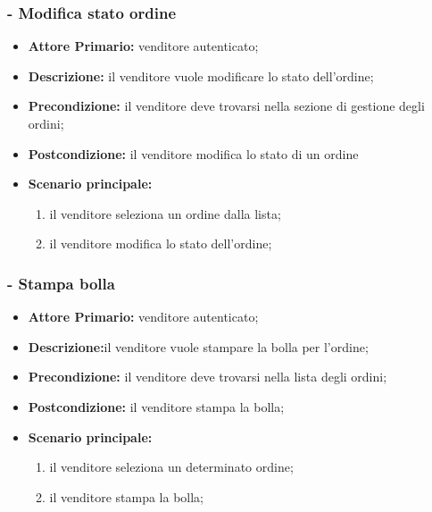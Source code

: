 \stepsubUserCase
\subsubsection{- Modifica stato ordine}
\begin{itemize}
    \item \textbf{Attore Primario:} venditore autenticato;
    \item \textbf{Descrizione:} il venditore vuole modificare lo stato dell'ordine;
    \item \textbf{Precondizione:} il venditore deve trovarsi nella sezione di gestione degli ordini;
    \item \textbf{Postcondizione:} il venditore modifica lo stato di un ordine
    \item \textbf{Scenario principale:}
    \begin{enumerate}
        \item il venditore seleziona un ordine dalla lista;
        \item il venditore modifica lo stato dell'ordine;
    \end{enumerate}
\end{itemize}

\stepsubUserCase
\subsubsection{- Stampa bolla}
\begin{itemize}
    \item \textbf{Attore Primario:} venditore autenticato;
    \item \textbf{Descrizione:}il venditore vuole stampare la bolla per l'ordine;
    \item \textbf{Precondizione:} il venditore deve trovarsi nella lista degli ordini;
    \item \textbf{Postcondizione:} il venditore stampa la bolla;
    \item \textbf{Scenario principale:}
    \begin{enumerate}
        \item il venditore seleziona un determinato ordine;
        \item il venditore stampa la bolla;
    \end{enumerate}
\end{itemize}

\stepsubUserCase
